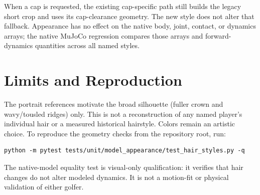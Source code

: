 \documentclass[11pt]{article}
\begin{document}
When a cap is requested, the existing cap-specific path still builds the
legacy short crop and uses its cap-clearance geometry. The new style does not
alter that fallback. Appearance has no effect on the native body, joint,
contact, or dynamics arrays; the native MuJoCo regression compares those
arrays and forward-dynamics quantities across all named styles.

\section{Limits and Reproduction}
The portrait references motivate the broad silhouette (fuller crown and
wavy/tousled ridges) only. This is not a reconstruction of any named player's
individual hair or a measured historical hairstyle. Colors remain an artistic
choice. To reproduce the geometry checks from the repository root, run:
\begin{verbatim}
python -m pytest tests/unit/model_appearance/test_hair_styles.py -q
\end{verbatim}
The native-model equality test is visual-only qualification: it verifies that
hair changes do not alter modeled dynamics. It is not a motion-fit or physical
validation of either golfer.
\end{document}
